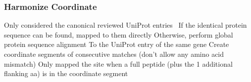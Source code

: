 \subsubsection{Harmonize Coordinate}
Only considered the canonical reviewed UniProt entries 
If the identical protein sequence can be found, mapped to them directly
Otherwise, perform global protein sequence alignment
To the UniProt entry of the same gene
Create coordinate segments of consecutive matches (don't allow any amino acid mismatch)
Only mapped the site when a full peptide (plus the 1 additional flanking aa) is in the coordinate segment

